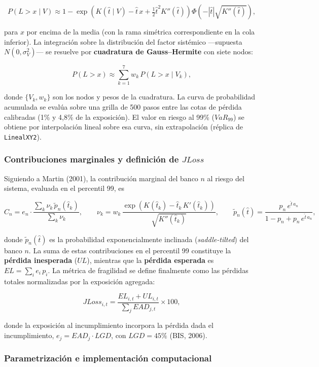 \documentclass[5p,times,twocolumn,authoryear]{elsarticle}
\begin{document}
\[ P(L > x \mid V) \approx 1 - \exp\!\left(K(\hat t\mid V) - \hat t\,x + \tfrac{1}{2}\hat t^{2} K''(\hat t)\right)\Phi\!\left(-|\hat t|\sqrt{K''(\hat t)}\right), \]

para $x$ por encima de la media (con la rama simétrica correspondiente en la cola inferior). La integración sobre la distribución del factor sistémico —supuesta $N(0,\sigma_V^{2})$— se resuelve por \textbf{cuadratura de Gauss–Hermite} con siete nodos:

\[ P(L > x) \approx \sum_{k=1}^{7} w_k\,P(L > x \mid V_k), \]

donde $\{V_k, w_k\}$ son los nodos y pesos de la cuadratura. La curva de probabilidad acumulada se evalúa sobre una grilla de 500 pasos entre las cotas de pérdida calibradas (1\% y 4,8\% de la exposición). El valor en riesgo al 99\% ($VaR_{99}$) se obtiene por interpolación lineal sobre esa curva, sin extrapolación (réplica de \texttt{LinealXY2}).

\subsubsection{Contribuciones marginales y definición de $JLoss$}

Siguiendo a Martin (2001), la contribución marginal del banco $n$ al riesgo del sistema, evaluada en el percentil 99, es

\[ C_n = e_n \cdot \frac{\sum_{k} \nu_k\,\tilde p_n(\hat t_k)}{\sum_{k}\nu_k}, \qquad \nu_k = w_k\,\frac{\exp\!\left(K(\hat t_k) - \hat t_k\,K'(\hat t_k)\right)}{\sqrt{K''(\hat t_k)}}, \qquad \tilde p_n(\hat t) = \frac{p_n\,e^{\hat t\,a_n}}{1 - p_n + p_n\,e^{\hat t\,a_n}}, \]

donde $\tilde p_n(\hat t)$ es la probabilidad exponencialmente inclinada (\textit{saddle-tilted}) del banco $n$. La suma de estas contribuciones en el percentil 99 constituye la \textbf{pérdida inesperada} ($UL$), mientras que la \textbf{pérdida esperada} es $EL = \sum_i e_i\,p_i$. La métrica de fragilidad se define finalmente como las pérdidas totales normalizadas por la exposición agregada:

\[ JLoss_{i,t} = \frac{EL_{i,t} + UL_{i,t}}{\sum_{j} EAD_{j,t}}\times 100, \]

donde la exposición al incumplimiento incorpora la pérdida dada el incumplimiento, $e_j = EAD_j\cdot LGD$, con $LGD = 45\%$ (BIS, 2006).

\subsubsection{Parametrización e implementación computacional}
\end{document}

